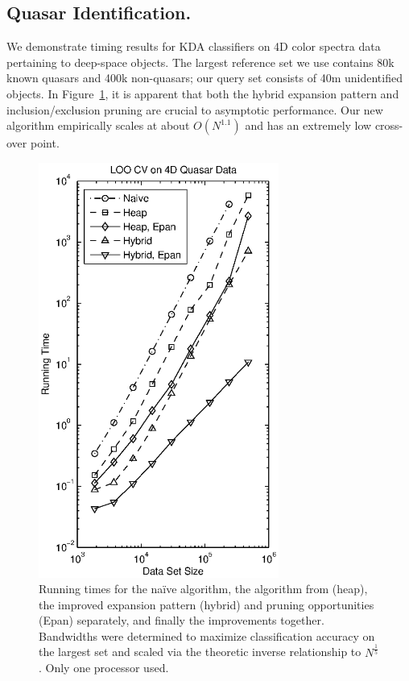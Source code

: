 \documentclass[twoside,leqno,twocolumn]{article}
\begin{document}
\subsection{Quasar Identification.}
We demonstrate timing results for KDA classifiers on 4D color spectra
data pertaining to deep-space objects.  The largest reference set we
use contains 80k known quasars and 400k non-quasars; our query set
consists of 40m unidentified objects.  In
Figure~\ref{fig:quasar-speed}, it is apparent that both the hybrid
expansion pattern and inclusion/exclusion pruning are crucial to
asymptotic performance.  Our new algorithm empirically scales at about
$O(N^{1.1})$ and has an extremely low cross-over point.

\begin{figure}[tb]
  \begin{center}
    \includegraphics[width=3.1in]{quasar_times_narrow.eps}
  \end{center}
  \vspace{-30pt}
  \caption{\label{fig:quasar-speed}\footnotesize Running times for the
    na\"{i}ve algorithm, the algorithm from \cite{nbc-compstat}
    (heap), the improved expansion pattern (hybrid) and pruning
    opportunities (Epan) separately, and finally the improvements
    together.  Bandwidths were determined to maximize classification
    accuracy on the largest set and scaled via the theoretic inverse
    relationship to $N^{\frac{1}{5}}$.  Only one processor used.}
\end{figure}
\end{document}
